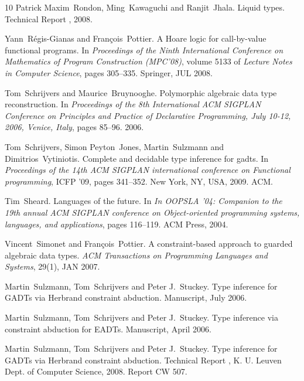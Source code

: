 \documentclass{article}
\newcommand{\tmtextit}[1]{{\itshape{#1}}}
\begin{document}
\begin{thebibliography}{10}
  Patrick Maxim~Rondon, Ming~Kawaguchi  and 
  Ranjit~Jhala.{\newblock} Liquid types.{\newblock} Technical Report ,
  2008.{\newblock}
  
  Yann~R{\'e}gis-Gianas  and  Fran{\c
  c}ois~Pottier.{\newblock} A Hoare logic for call-by-value functional
  programs.{\newblock} In \tmtextit{Proceedings of the Ninth International
  Conference on Mathematics of Program Construction (MPC'08)},  volume  5133 
  of \tmtextit{Lecture Notes in Computer Science},  pages  305--335. Springer,
  JUL 2008.{\newblock}
  
  Tom~Schrijvers  and 
  Maurice~Bruynooghe.{\newblock} Polymorphic algebraic data type
  reconstruction.{\newblock} In \tmtextit{Proceedings of the 8th International
  ACM SIGPLAN Conference on Principles and Practice of Declarative
  Programming, July 10-12, 2006, Venice, Italy},  pages  85--96.
  2006.{\newblock}
  
  Tom~Schrijvers, Simon Peyton~Jones,
  Martin~Sulzmann  and  Dimitrios~Vytiniotis.{\newblock} Complete and
  decidable type inference for gadts.{\newblock} In \tmtextit{Proceedings of
  the 14th ACM SIGPLAN international conference on Functional programming},
  ICFP '09,  pages  341--352. New York, NY, USA, 2009. ACM.{\newblock}
  
  Tim~Sheard.{\newblock} Languages of the
  future.{\newblock} In \tmtextit{In OOPSLA '04: Companion to the 19th annual
  ACM SIGPLAN conference on Object-oriented programming systems, languages,
  and applications},  pages  116--119. ACM Press, 2004.{\newblock}
  
  Vincent~Simonet  and  Fran{\c
  c}ois~Pottier.{\newblock} A constraint-based approach to guarded algebraic
  data types.{\newblock} \tmtextit{ACM Transactions on Programming Languages
  and Systems}, 29(1), JAN 2007.{\newblock}
  
  Martin~Sulzmann, Tom~Schrijvers  and  Peter
  J.~Stuckey.{\newblock} Type inference for GADTs via Herbrand constraint
  abduction.{\newblock} Manuscript, July 2006.{\newblock}
  
  Martin~Sulzmann, Tom~Schrijvers  and  Peter
  J.~Stuckey.{\newblock} Type inference via constraint abduction for
  EADTs.{\newblock} Manuscript, April 2006.{\newblock}
  
  Martin~Sulzmann, Tom~Schrijvers  and  Peter
  J.~Stuckey.{\newblock} Type inference for GADTs via Herbrand constraint
  abduction.{\newblock} Technical Report , K. U. Leuven Dept. of Computer
  Science, 2008.{\newblock} Report CW 507.{\newblock}
  

\end{thebibliography}
\end{document}
